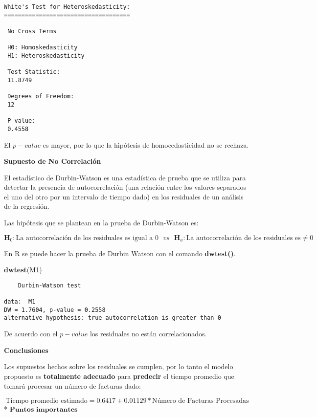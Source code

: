 \documentclass[
  a4paper,
  oneside,
  openany]{book}
\newenvironment{Shaded}{\begin{snugshade}}{\end{snugshade}}
\newcommand{\KeywordTok}[1]{\textcolor[rgb]{0.13,0.29,0.53}{\textbf{#1}}}
\newcommand{\NormalTok}[1]{#1}
\begin{document}
\begin{verbatim}
White's Test for Heteroskedasticity:
==================================== 

 No Cross Terms

 H0: Homoskedasticity
 H1: Heteroskedasticity

 Test Statistic:
 11.8749 

 Degrees of Freedom:
 12 

 P-value:
 0.4558 
\end{verbatim}

El \(p-value\) es mayor, por lo que la hipótesis de homocedasticidad no se rechaza.

\textbf{Supuesto de No Correlación}

El estadístico de Durbin-Watson es una estadística de prueba que se utiliza para detectar la presencia de autocorrelación (una relación entre los valores separados el uno del otro por un intervalo de tiempo dado) en los residuales de un análisis de la regresión.

Las hipótesis que se plantean en la prueba de Durbin-Watson es:

\[\textbf{H}_0: \mbox{La autocorrelación de los residuales es igual a } 0 \ \ \  vs \ \ \  \textbf{H}_a: \mbox{La autocorrelación de los residuales es} \neq 0\]

En R se puede hacer la prueba de Durbin Watson con el comando \textbf{dwtest()}.

\begin{Shaded}
\begin{Highlighting}[]
\KeywordTok{dwtest}\NormalTok{(M1)}
\end{Highlighting}
\end{Shaded}

\begin{verbatim}
    Durbin-Watson test

data:  M1
DW = 1.7604, p-value = 0.2558
alternative hypothesis: true autocorrelation is greater than 0
\end{verbatim}

De acuerdo con el \(p-value\) los residuales no están correlacionados.

\textbf{Conclusiones}

Los supuestos hechos sobre los residuales se cumplen, por lo tanto el modelo propuesto es \textbf{totalmente adecuado} para \textbf{predecir} el tiempo promedio que tomará procesar un número de facturas dado:

\[\mbox{Tiempo promedio estimado}=0.6417+0.01129* \mbox{Número de Facturas Procesadas} \]
* \(\textbf{Puntos importantes}\)
\end{document}
